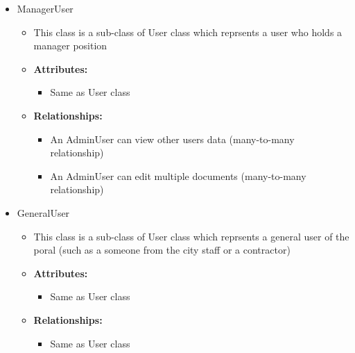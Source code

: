 \documentclass[12pt]{article}
\begin{document}
\begin{itemize}
  \item ManagerUser
    \begin{itemize}
      \item This class is a sub-class of User class which reprsents a
        user who holds a manager position
      \item \textbf{Attributes:}
        \begin{itemize}
          \item Same as User class
        \end{itemize}
      \item \textbf{Relationships:}
        \begin{itemize}
          \item An AdminUser can view other users data (many-to-many
            relationship)
          \item An AdminUser can edit multiple documents
            (many-to-many relationship)
        \end{itemize}
    \end{itemize}

  \item GeneralUser
    \begin{itemize}
      \item This class is a sub-class of User class which reprsents a
        general user of the poral (such as a someone from the city
        staff or a contractor)
      \item \textbf{Attributes:}
        \begin{itemize}
          \item Same as User class
        \end{itemize}
      \item \textbf{Relationships:}
        \begin{itemize}
          \item Same as User class
        \end{itemize}
    \end{itemize}


\end{itemize}
\end{document}
